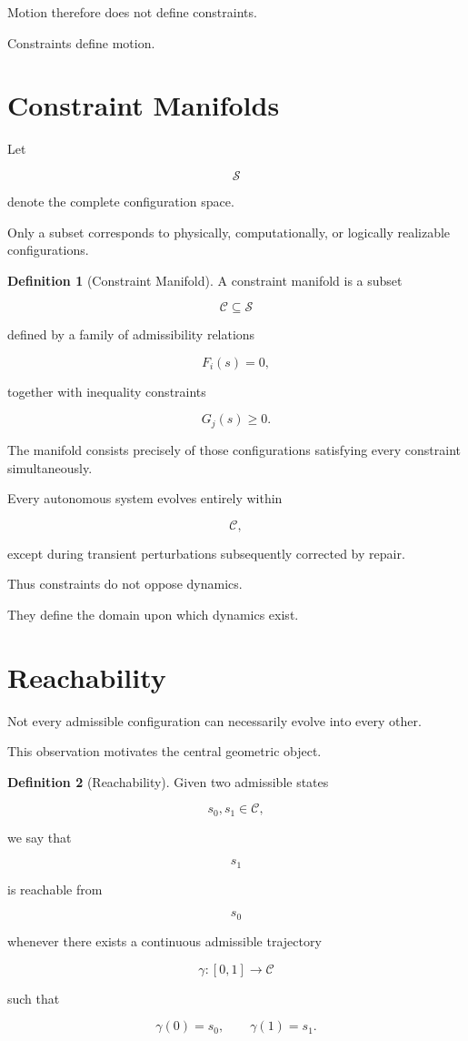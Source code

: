 \documentclass[11pt,oneside]{book}
\numberwithin{equation}{chapter}
\theoremstyle{definition}
\newtheorem{definition}{Definition}[chapter]
\theoremstyle{plain}
\begin{document}
Motion therefore does not define constraints.

Constraints define motion.

\section{Constraint Manifolds}

Let

\[
\mathcal{S}
\]

denote the complete configuration space.

Only a subset corresponds to physically, computationally, or logically
realizable configurations.

\begin{definition}[Constraint Manifold]

A constraint manifold is a subset

\[
\mathcal{C}
\subseteq
\mathcal{S}
\]

defined by a family of admissibility relations

\[
F_i(s)=0,
\]

together with inequality constraints

\[
G_j(s)\ge0.
\]

The manifold consists precisely of those configurations satisfying every
constraint simultaneously.

\end{definition}

Every autonomous system evolves entirely within

\[
\mathcal{C},
\]

except during transient perturbations subsequently corrected by repair.

Thus constraints do not oppose dynamics.

They define the domain upon which dynamics exist.

\section{Reachability}

Not every admissible configuration can necessarily evolve into every other.

This observation motivates the central geometric object.

\begin{definition}[Reachability]

Given two admissible states

\[
s_0,s_1
\in
\mathcal{C},
\]

we say that

\[
s_1
\]

is reachable from

\[
s_0
\]

whenever there exists a continuous admissible trajectory

\[
\gamma:[0,1]\rightarrow\mathcal{C}
\]

such that

\[
\gamma(0)=s_0,
\qquad
\gamma(1)=s_1.
\]

\end{definition}
\end{document}
